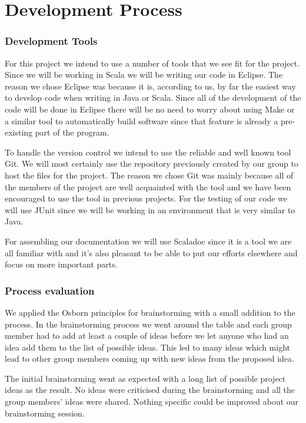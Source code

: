 \documentclass[a4paper]{article}
\begin{document}
\part{Development Process}
\section{Development Tools}
For this project we intend to use a number of tools that we see fit for the project.
Since we will be working in Scala we will be writing our code in Eclipse. The reason we chose Eclipse was because it is, according to us, by far the easiest way to develop code when writing in Java or Scala. Since all of the development of the code will be done in Eclipse there will be no need to worry about using Make or a similar tool to automatically build software since that feature is already a pre-existing part of the program.
 
To handle the version control we intend to use the reliable and well known tool Git. We will most certainly use the repository previously created by our group to host the files for the project. The reason we chose Git was mainly because all of the members of the project are well acquainted with the tool and we have been encouraged to use the tool in previous projects.
For the testing of our code we will use JUnit since we will be working in an environment that is very similar to Java.

For assembling our documentation we will use Scaladoc since it is a tool we are all familiar with and it’s also pleasant to be able to put our efforts elsewhere and focus on more important parts. 

\section{Process evaluation}
We applied the Osborn principles for brainstorming with a small addition to the process. In the brainstorming process we went around the table and each group member had to add at least a couple of ideas before we let anyone who had an idea add them to the list of possible ideas. This led to many ideas which might lead to other group members coming up with new ideas from the proposed idea.

The initial brainstorming went as expected with a long list of possible project ideas as the result. No ideas were criticised during the brainstorming and all the group members' ideas were shared. Nothing specific could be improved about our brainstorming session. 
\end{document}
